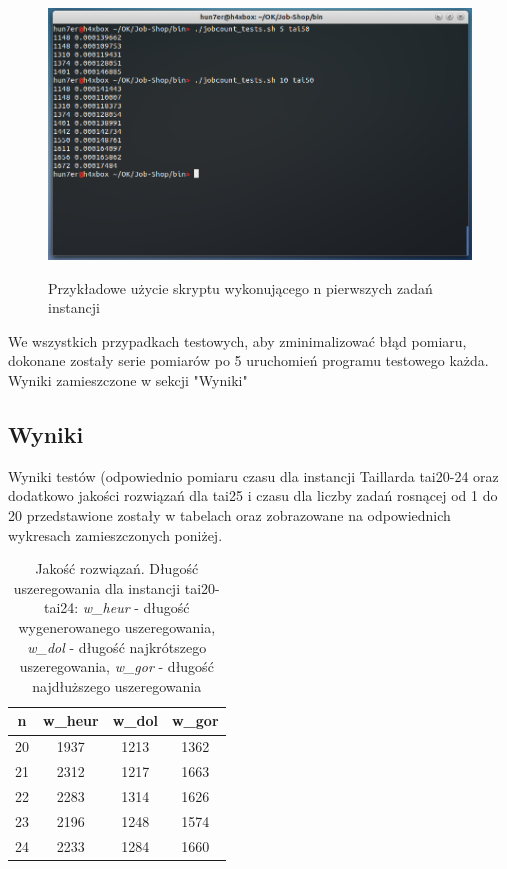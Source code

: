 \documentclass[a4paper,11pt]{article}
\begin{document}
\begin{figure}[!h]
\begin{center}
\includegraphics[scale=0.40]{images/uzycie3.png} \\
\end {center}
\caption{Przykładowe użycie skryptu wykonującego n pierwszych zadań instancji}
\end{figure}

We wszystkich przypadkach testowych, aby zminimalizować błąd pomiaru, dokonane zostały serie pomiarów po 5 uruchomień programu testowego każda. Wyniki zamieszczone w sekcji "Wyniki"

\subsection{Wyniki}
Wyniki testów (odpowiednio pomiaru czasu dla instancji Taillarda tai20-24 oraz dodatkowo jakości rozwiązań dla tai25 i czasu dla liczby zadań rosnącej od 1 do 20 przedstawione zostały w tabelach oraz zobrazowane na odpowiednich wykresach zamieszczonych poniżej.


\begin{table}
\begin{center}
\begin{tabular}{ | c | c | c | c | }
\hline
n & w\_heur & w\_dol & w\_gor \\ \hline
20 & 1937 & 1213 & 1362 \\ \hline
21 & 2312 & 1217 & 1663 \\ \hline
22 & 2283 & 1314 & 1626 \\ \hline
23 & 2196 & 1248 & 1574 \\ \hline
24 & 2233 & 1284 & 1660 \\ \hline
\end{tabular}
\caption{Jakość rozwiązań. Długość uszeregowania dla instancji tai20-tai24: \emph{w\_heur} - długość wygenerowanego uszeregowania, \emph{w\_dol} - długość najkrótszego uszeregowania, \emph{w\_gor} - długość najdłuższego uszeregowania }
\end{center}
\end{table}
\end{document}
